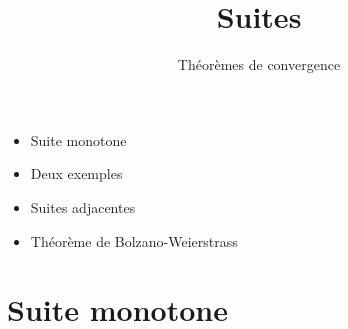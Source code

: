 











\title{{\bf Suites}}
\subtitle{Théorèmes de convergence}


\begin{frame}
  
  \debutmontitre

  \pause

{\footnotesize
\hfill
{}
\begin{minipage}{0.6\textwidth}
  \begin{itemize}
    \item<3-> Suite monotone
    \item<4-> Deux exemples
    \item<5-> Suites adjacentes
    \item<6-> Théorème de Bolzano-Weierstrass
  \end{itemize}
\end{minipage}
}

\end{frame}

\setcounter{framenumber}{0}

\section{Suite monotone}

